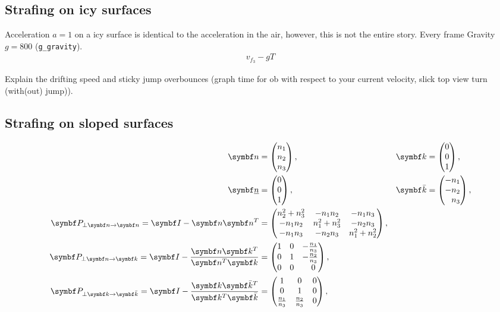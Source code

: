 \subsection{Strafing on icy surfaces}
\label{sec:icy}
Acceleration $a = 1$ on a icy surface is identical to the acceleration in the air, however, this is not the entire story. Every frame Gravity $g = 800$ (\texttt{g\_gravity}).
\begin{align*}
v_{f_3} - gT
\end{align*}

Explain the drifting speed and sticky jump overbounces (graph time for ob with respect to your current velocity, slick top view turn (with(out) jump)).


\subsection{Strafing on sloped surfaces}
\begin{align*}
\vec{n} &=
\begin{pmatrix}
n_1\\n_2\\n_3
\end{pmatrix}, & \vec{k} &=
\begin{pmatrix}
0\\0\\1
\end{pmatrix},\\
\vec{\flat{n}} &=
\begin{pmatrix}
0\\0\\1
\end{pmatrix}, &
\vec{\bar{k}} &=
\begin{pmatrix}
-n_1\\-n_2\\\hphantom{-}n_3
\end{pmatrix},\\
%
\mat{P}_{\perp \vec{n} \rightarrow \vec{n}} = \mat{I} - \vec{n}\vec{n}^T &=
\begin{pmatrix}
n_2^2+n_3^2 & -n_1 n_2 & -n_1 n_3\\
-n_1 n_2 & n_1^2+n_3^2 & -n_2 n_3\\
-n_1 n_3 & -n_2 n_3 & n_1^2+n_2^2
\end{pmatrix},\\
\mat{P}_{\perp \vec{n} \rightarrow \vec{k}} = \mat{I} - \frac{\vec{n}\vec{k}^T}{\vec{n}^T\vec{k}} &=
\begin{pmatrix}
1 & 0 & -\frac{n_1}{n_3}\\
0 & 1 & -\frac{n_2}{n_3}\\
0 & 0 & \hphantom{-}0
\end{pmatrix},\\
\mat{P}_{\perp \vec{k} \rightarrow \vec{\bar{k}}} = \mat{I} - \frac{\vec{k}\vec{\bar{k}}^T}{\vec{k}^T\vec{\bar{k}}} &=
\begin{pmatrix}
1 & 0 & 0\\
0 & 1 & 0\\
\frac{n_1}{n_3} & \frac{n_2}{n_3} & 0
\end{pmatrix},
\end{align*}

